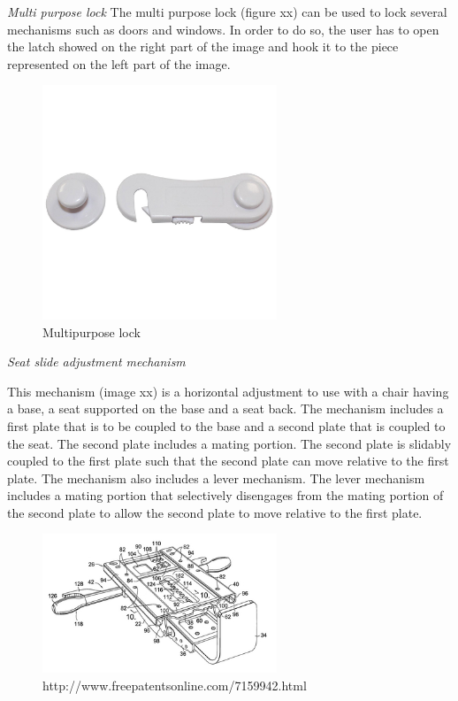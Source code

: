 \emph{Multi purpose lock}
The multi purpose lock (figure xx) can be used to lock several mechanisms such as doors and windows. In order to do so, the user has to open the latch showed on the right part of the image and hook it to the piece represented on the left part of the image.

\begin{figure}[h]
\centering
\includegraphics[width=7cm]{brazil_images/image044.png}
\caption{Multipurpose lock}
\label{fig:lock}
\end{figure}


\emph{Seat slide adjustment mechanism}

This mechanism (image xx) is a horizontal adjustment to use with a chair having a base, a seat supported on the base and a seat back. The mechanism includes a first plate that is to be coupled to the base and a second plate that is coupled to the seat. The second plate includes a mating portion. The second plate is slidably coupled to the first plate such that the second plate can move relative to the first plate. The mechanism also includes a lever mechanism. The lever mechanism includes a mating portion that selectively disengages from the mating portion of the second plate to allow the second plate to move relative to the first plate.

\begin{figure}[h]
\centering
\includegraphics[width=7cm]{brazil_images/image045.png}
\caption{http://www.freepatentsonline.com/7159942.html}
\label{fig:patent}
\end{figure}


